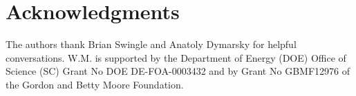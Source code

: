 \documentclass[12pt,a4paper]{article}
\begin{document}
\section*{Acknowledgments}

The authors thank Brian Swingle and Anatoly Dymarsky for helpful conversations. W.M. is supported by the Department of Energy (DOE) Office of Science (SC) Grant No DOE DE-FOA-0003432 and by Grant No GBMF12976 of the Gordon and Betty Moore Foundation.

 



\end{document}
